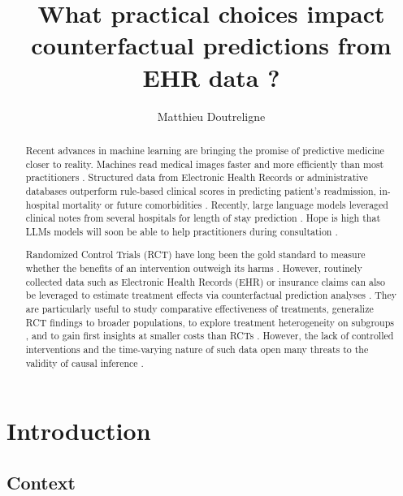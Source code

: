 \documentclass{article}
\title{What practical choices impact counterfactual predictions from EHR data ?}
\author{
  Matthieu Doutreligne \\
}
\begin{document}
\maketitle
\begin{abstract}


  Recent advances in machine learning are bringing the promise of predictive
  medicine closer to reality. Machines read medical images faster and more
  efficiently than most practitioners \citep{zhou2021review}. Structured data from Electronic Health
  Records \citep{rajkomar2018scalable} or administrative databases
  \citep{beaulieu2021machine} outperform rule-based clinical scores in
  predicting patient's readmission, in-hospital mortality or future
  comorbidities \citep{li2020behrt}. Recently, large language models leveraged
  clinical notes from several hospitals for length of stay prediction
  \citep{jiang2023health}. Hope is high that LLMs models will soon be able to
  help practitioners during consultation \citep{lee2023benefits}.

  Randomized Control Trials (RCT) have
  long been the gold standard to measure whether the benefits of an intervention
  outweigh its harms \citep{brook1986method}. However, routinely collected data
  such as Electronic Health Records (EHR) or insurance claims
  \citep{wang2023early} can also be leveraged to estimate treatment effects via
  counterfactual prediction analyses \citep{hernan2019second}.  They are
  particularly useful to study comparative effectiveness of treatments,
  generalize RCT findings to broader populations, to explore treatment
  heterogeneity on subgroups \citep{mant1999can,desai2021broadening}, and to
  gain first insights at smaller costs than RCTs
  \citep{black1996we,bosdriesz2020evidence}. However, the lack of controlled
  interventions and the time-varying nature of such data open many threats to
  the validity of causal inference \citep{bouvier2023should}.


\end{abstract}





\section{Introduction}

\subsection{Context}
\end{document}
